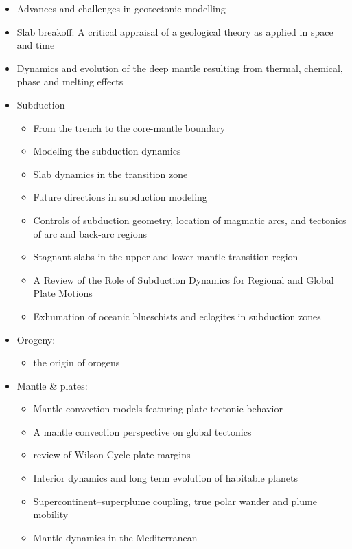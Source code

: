 \begin{itemize}
\item Advances and challenges in geotectonic modelling \cite{bufy14}
\item Slab breakoff: A critical appraisal of a geological theory as applied in space and time \cite{garm18}
\item Dynamics and evolution of the deep mantle resulting from thermal, chemical, phase and melting effects \cite{tack12}

\item Subduction
   \begin{itemize}
   \item From the trench to the core-mantle boundary \cite{kinc95}
   \item Modeling the subduction dynamics \cite{bill08}
   \item Slab dynamics in the transition zone \cite{bill10}
   \item Future directions in subduction modeling \cite{gery11}
   \item Controls of subduction geometry, location of magmatic arcs, 
         and tectonics of arc and back-arc regions \cite{crpi82}
   \item Stagnant slabs in the upper and lower mantle transition region \cite{fuwo01}
   \item A Review of the Role of Subduction Dynamics for Regional and Global Plate Motions \cite{befa09}
   \item Exhumation of oceanic blueschists and eclogites in subduction zones \cite{agyj09}
   \end{itemize}

\item Orogeny:
   \begin{itemize}
   \item the origin of orogens \cite{jabe13} 
   \end{itemize}

\item Mantle \& plates:
   \begin{itemize}
   \item Mantle convection models featuring plate tectonic behavior \cite{lowm11}
   \item A mantle convection perspective on global tectonics \cite{cogu17}
   \item review of Wilson Cycle plate margins \cite{buto14}
   \item Interior dynamics and long term evolution of habitable planets \cite{taab12}
   \item Supercontinent–superplume coupling, true polar wander and plume mobility \cite{lizh09}
   \item Mantle dynamics in the Mediterranean \cite{faba14}
   \end{itemize}


\end{itemize}
